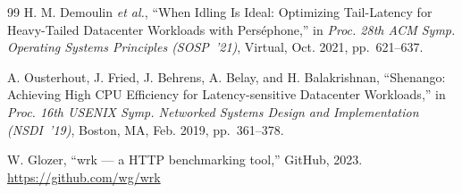 \documentclass[conference]{IEEEtran}
\begin{document}
\begin{thebibliography}{99}
H. M. Demoulin \textit{et al.},
``When Idling Is Ideal: Optimizing Tail-Latency for Heavy-Tailed Datacenter
Workloads with Perséphone,''
in \textit{Proc. 28th ACM Symp. Operating Systems Principles (SOSP~'21)},
Virtual, Oct. 2021, pp.~621--637.

A. Ousterhout, J. Fried, J. Behrens, A. Belay, and H. Balakrishnan,
``Shenango: Achieving High CPU Efficiency for Latency-sensitive Datacenter
Workloads,''
in \textit{Proc. 16th USENIX Symp. Networked Systems Design and
Implementation (NSDI~'19)},
Boston, MA, Feb. 2019, pp.~361--378.

W. Glozer, ``wrk --- a HTTP benchmarking tool,'' GitHub, 2023.
\url{https://github.com/wg/wrk}

\end{thebibliography}
\end{document}
